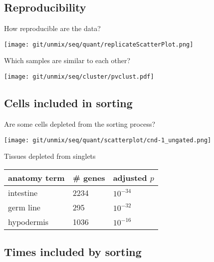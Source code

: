 \documentclass[serif,9pt]{beamer}
\begin{document}
\subsection{Reproducibility}

\begin{frame}{How reproducible are the data?}

\texttt{[image: git/unmix/seq/quant/replicateScatterPlot.png]}

\end{frame}

\begin{frame}{Which samples are similar to each other?}

\texttt{[image: git/unmix/seq/cluster/pvclust.pdf]}

\end{frame}

\subsection{Cells included in sorting}

\begin{frame}{Are some cells depleted from the sorting process?}

\begin{minipage}{0.58\textwidth}
\texttt{[image: git/unmix/seq/quant/scatterplot/cnd-1\_ungated.png]}
\end{minipage}
\pause
\begin{minipage}{0.4\textwidth}
Tissues depleted from singlets
\begin{table}[!tbp]\scriptsize
\begin{tabular}{lll}
anatomy term & \# genes & adjusted $p$ \\
\hline
intestine & 2234 & $10^{-34}$ \\
germ line & 295 & $10^{-32}$ \\
hypodermis & 1036 & $10^{-16}$ \\
\end{tabular}
\end{table}
\end{minipage}

\end{frame}

\subsection{Times included by sorting}
\end{document}

